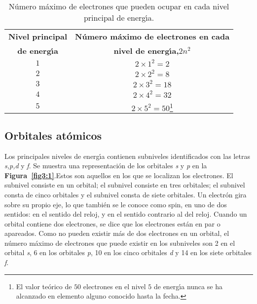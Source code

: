 \begin{table}[hbt]
\caption[Electrones en el nivel principal de energ\'{\i}a]{N\'umero m\'aximo de
electrones que pueden ocupar en cada nivel principal de energ\'{\i}a.}
\label{tab1.cap3}
\begin{minipage}{\linewidth}
\begin{center}
\begin{tabular}{ cc }\hline
\textbf{Nivel principal} &\textbf{N\'umero m\'aximo de electrones en cada}\\
\textbf{de energ\'{\i}a}& \textbf{nivel de energ\'{\i}a,}$2n^2$\\ \hline
$1$&$2\times 1^2 = 2$\\
$2$&$2\times 2^2 = 8$\\
$3$&$2\times 3^2 = 18$\\
$4$&$2\times 4^2 = 32$\\
$5$&$2\times 5^2 = 50$\footnote{El valor te\'orico de $50$ electrones en el
nivel $5$ de energ\'{\i}a nunca se  ha alcanzado en elemento alguno conocido hasta la
fecha.}\\ \hline 
\end{tabular}
\end{center}
\end{minipage}
\end{table}


\subsection{Orbitales at\'omicos}
Los principales niveles de energ\'{\i}a contienen subniveles identificados con
las letras \textit{s,p,d} y \textit{f}. Se muestra una representaci\'on de los orbitales \textit{s} y \textit{p} en la \textbf{Figura~\ref{fig3:1}}.Estos  
 son aquellos en los que se localizan los electrones. El subnivel
 consiste en un orbital; el subnivel
  consiste en tres orbitales; el subnivel
 consta de cinco orbitales y el subnivel
 consta de siete orbitales. Un electr\'on gira sobre su propio eje, lo que tambi\'en se le conoce como spin,  en uno de dos sentidos: en el sentido del reloj, y en el sentido contrario al del reloj. Cuando un or\-bital contiene dos electrones, se dice que los electrones est\'an en par o apareados. Como no pueden existir m\'as de dos electrones en un orbital, el n\'umero m\'aximo de electrones que puede existir en los subniveles son  2 en el orbital \textit{s}, 6 en los orbitales \textit{p}, 10 en los cinco orbitales \textit{d} y 14 en los siete orbitales \textit{f}.

